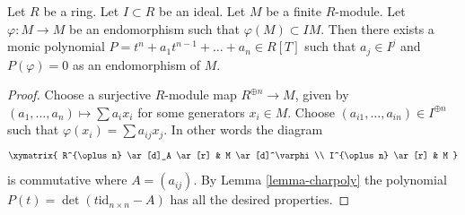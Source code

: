 \begin{lemma}
\label{lemma-charpoly-module-ideal}
Let $R$ be a ring. Let $I \subset R$ be an ideal.
Let $M$ be a finite $R$-module.
Let $\varphi : M \to M$ be an endomorphism such
that $\varphi(M) \subset IM$.
Then there exists a monic polynomial
$P = t^n + a_1 t^{n - 1} + \ldots + a_n \in R[T]$
such that $a_j \in I^j$ and $P(\varphi) = 0$ as an endomorphism of $M$.
\end{lemma}

\begin{proof}
Choose a surjective $R$-module map $R^{\oplus n} \to M$, given by
$(a_1, \ldots, a_n) \mapsto \sum a_ix_i$ for some generators $x_i \in M$.
Choose $(a_{i1}, \ldots, a_{in}) \in I^{\oplus n}$ such that
$\varphi(x_i) = \sum a_{ij} x_j$. In other words the diagram
$$
\xymatrix{
R^{\oplus n} \ar[d]_A \ar[r] & M \ar[d]^\varphi \\
I^{\oplus n} \ar[r] & M
}
$$
is commutative where $A = (a_{ij})$. By
Lemma \ref{lemma-charpoly}
the polynomial
$P(t) = \det(t\text{id}_{n \times n} - A)$
has all the desired properties.
\end{proof}